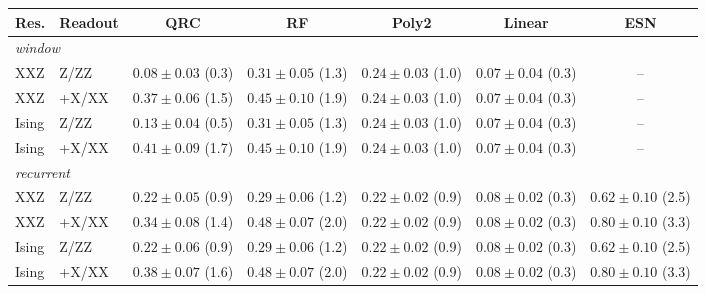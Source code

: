 \begin{tabular}{llccccc}
\toprule
Res. & Readout & QRC & RF & Poly2 & Linear & ESN \\
\midrule
\multicolumn{7}{l}{\emph{window}} \\
XXZ & Z/ZZ & $0.08\pm0.03$ (0.3) & $\mathbf{0.31}\pm0.05$ (1.3) & $0.24\pm0.03$ (1.0) & $0.07\pm0.04$ (0.3) & -- \\
XXZ & +X/XX & $0.37\pm0.06$ (1.5) & $\mathbf{0.45}\pm0.10$ (1.9) & $0.24\pm0.03$ (1.0) & $0.07\pm0.04$ (0.3) & -- \\
Ising & Z/ZZ & $0.13\pm0.04$ (0.5) & $\mathbf{0.31}\pm0.05$ (1.3) & $0.24\pm0.03$ (1.0) & $0.07\pm0.04$ (0.3) & -- \\
Ising & +X/XX & $0.41\pm0.09$ (1.7) & $\mathbf{0.45}\pm0.10$ (1.9) & $0.24\pm0.03$ (1.0) & $0.07\pm0.04$ (0.3) & -- \\
\midrule
\multicolumn{7}{l}{\emph{recurrent}} \\
XXZ & Z/ZZ & $0.22\pm0.05$ (0.9) & $0.29\pm0.06$ (1.2) & $0.22\pm0.02$ (0.9) & $0.08\pm0.02$ (0.3) & $\mathbf{0.62}\pm0.10$ (2.5) \\
XXZ & +X/XX & $0.34\pm0.08$ (1.4) & $0.48\pm0.07$ (2.0) & $0.22\pm0.02$ (0.9) & $0.08\pm0.02$ (0.3) & $\mathbf{0.80}\pm0.10$ (3.3) \\
Ising & Z/ZZ & $0.22\pm0.06$ (0.9) & $0.29\pm0.06$ (1.2) & $0.22\pm0.02$ (0.9) & $0.08\pm0.02$ (0.3) & $\mathbf{0.62}\pm0.10$ (2.5) \\
Ising & +X/XX & $0.38\pm0.07$ (1.6) & $0.48\pm0.07$ (2.0) & $0.22\pm0.02$ (0.9) & $0.08\pm0.02$ (0.3) & $\mathbf{0.80}\pm0.10$ (3.3) \\
\bottomrule
\end{tabular}
